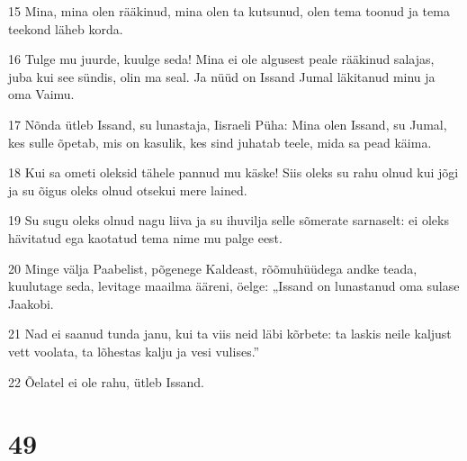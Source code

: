 \par 15 Mina, mina olen rääkinud, mina olen ta kutsunud, olen tema toonud ja tema teekond läheb korda.
\par 16 Tulge mu juurde, kuulge seda! Mina ei ole algusest peale rääkinud salajas, juba kui see sündis, olin ma seal. Ja nüüd on Issand Jumal läkitanud minu ja oma Vaimu.
\par 17 Nõnda ütleb Issand, su lunastaja, Iisraeli Püha: Mina olen Issand, su Jumal, kes sulle õpetab, mis on kasulik, kes sind juhatab teele, mida sa pead käima.
\par 18 Kui sa ometi oleksid tähele pannud mu käske! Siis oleks su rahu olnud kui jõgi ja su õigus oleks olnud otsekui mere lained.
\par 19 Su sugu oleks olnud nagu liiva ja su ihuvilja selle sõmerate sarnaselt: ei oleks hävitatud ega kaotatud tema nime mu palge eest.
\par 20 Minge välja Paabelist, põgenege Kaldeast, rõõmuhüüdega andke teada, kuulutage seda, levitage maailma ääreni, öelge: „Issand on lunastanud oma sulase Jaakobi.
\par 21 Nad ei saanud tunda janu, kui ta viis neid läbi kõrbete: ta laskis neile kaljust vett voolata, ta lõhestas kalju ja vesi vulises.”
\par 22 Õelatel ei ole rahu, ütleb Issand.

\chapter{49}

